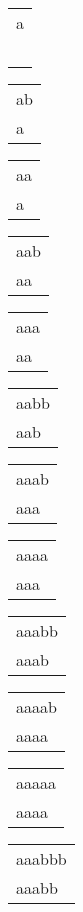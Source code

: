 \begin{tabular}{|l|} \hline
a \\
\  \\
\hline
\end{tabular} 
\begin{tabular}{|l|} \hline
ab \\
a\  \\
\hline
\end{tabular} 
\begin{tabular}{|l|} \hline
aa \\
a\  \\
\hline
\end{tabular} 
\begin{tabular}{|l|} \hline
aab \\
aa\  \\
\hline
\end{tabular} 
\begin{tabular}{|l|} \hline
aaa \\
aa\  \\
\hline
\end{tabular} 
\begin{tabular}{|l|} \hline
aabb \\
aab\  \\
\hline
\end{tabular} 
\begin{tabular}{|l|} \hline
aaab \\
aaa\  \\
\hline
\end{tabular} 
\begin{tabular}{|l|} \hline
aaaa \\
aaa\  \\
\hline
\end{tabular} 
\begin{tabular}{|l|} \hline
aaabb \\
aaab\  \\
\hline
\end{tabular} 
\begin{tabular}{|l|} \hline
aaaab \\
aaaa\  \\
\hline
\end{tabular} 
\begin{tabular}{|l|} \hline
aaaaa \\
aaaa\  \\
\hline
\end{tabular} 
\begin{tabular}{|l|} \hline
aaabbb \\
aaabb\  \\
\hline
\end{tabular} 
